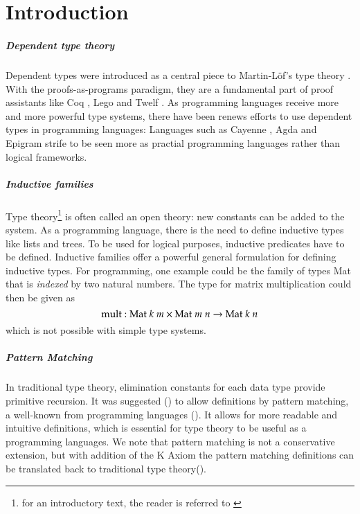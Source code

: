 \chapter{Introduction}

\paragraph*{Dependent type theory}

Dependent types were introduced as a central piece to Martin-L\"of's type theory \cite{mart84}. With the proofs-as-programs paradigm, they are a fundamental part of proof assistants like Coq \cite{coq} , Lego \cite{pollack94theory} and Twelf \cite{pfenning99system}.
As programming languages receive more and more powerful type systems, there have been renews efforts to use dependent types in programming languages: Languages such as Cayenne \cite{augustsson98cayenne}, Agda \cite{norell:thesis} and Epigram \cite{epigram} strife to be seen more as practial programming languages rather than logical frameworks. 

\paragraph*{Inductive families}
Type theory\footnote{for an introductory text, the reader is referred to \cite{NPS:promlt}}
 is often called an open theory: new constants can be added to the system.
As a programming language, there is the need to define inductive types like lists and trees.
To be used for logical purposes, inductive predicates have to be defined. 
Inductive families \cite{dybjer94inductive} offer a powerful general formulation for defining inductive types.  
For programming, one example could be the family of types Mat that is \emph{indexed} by two natural numbers.
The type for matrix multiplication could then be given as 
\[ \mbox{mult} : \mbox{Mat} \; k \; m \times \mbox{Mat} \; m \; n \rightarrow \mbox{Mat} \; k \; n \]
which is not possible with simple type systems.
\paragraph*{Pattern Matching}
In traditional type theory, elimination constants for each data type provide primitive recursion. 
It was suggested (\cite{coquand92pattern}) to allow definitions by pattern matching, a well-known from programming languages (\cite{DBLP:conf/fpca/Augustsson85}).
It allows for more readable and intuitive definitions, which is essential for type theory to be useful as a programming languages. 
We note that pattern matching is not a conservative extension, but with addition of the K Axiom the pattern matching definitions can be translated back to traditional type theory(\cite{hofmann95groupoid,GoguHMcBrCM2006}). 

